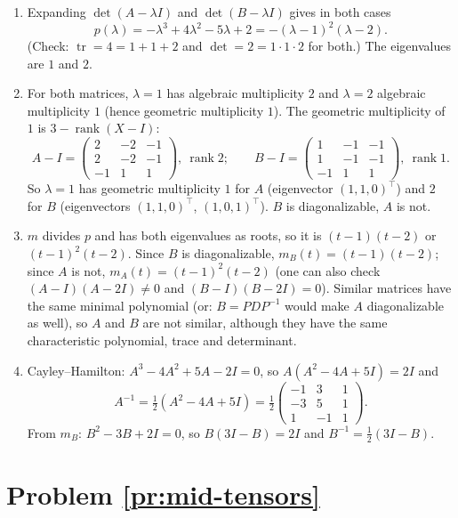 \documentclass[11pt]{article}
\DeclareMathOperator{\rank}{rank}
\DeclareMathOperator{\tr}{tr}
\begin{document}
\begin{enumerate}[label=(\alph*)]
    \item Expanding $\det(A - \lambda I)$ and $\det(B - \lambda I)$ gives in both cases
    \[p(\lambda) = -\lambda^3 + 4\lambda^2 - 5\lambda + 2 = -(\lambda - 1)^2(\lambda - 2).\]
    (Check: $\tr = 4 = 1 + 1 + 2$ and $\det = 2 = 1 \cdot 1 \cdot 2$ for both.) The eigenvalues are $1$ and $2$.
    \item For both matrices, $\lambda = 1$ has algebraic multiplicity $2$ and $\lambda = 2$ algebraic multiplicity $1$ (hence geometric multiplicity $1$). The geometric multiplicity of $1$ is $3 - \rank(X - I)$:
    \[A - I = \begin{pmatrix} 2 & -2 & -1 \\ 2 & -2 & -1 \\ -1 & 1 & 1 \end{pmatrix}, \ \rank 2; \qquad B - I = \begin{pmatrix} 1 & -1 & -1 \\ 1 & -1 & -1 \\ -1 & 1 & 1 \end{pmatrix}, \ \rank 1.\]
    So $\lambda = 1$ has geometric multiplicity $1$ for $A$ (eigenvector $(1, 1, 0)^\top$) and $2$ for $B$ (eigenvectors $(1, 1, 0)^\top$, $(1, 0, 1)^\top$). $B$ is diagonalizable, $A$ is not.
    \item $m$ divides $p$ and has both eigenvalues as roots, so it is $(t - 1)(t - 2)$ or $(t - 1)^2(t - 2)$. Since $B$ is diagonalizable, $m_B(t) = (t - 1)(t - 2)$; since $A$ is not, $m_A(t) = (t - 1)^2(t - 2)$ (one can also check $(A - I)(A - 2I) \neq 0$ and $(B - I)(B - 2I) = 0$). Similar matrices have the same minimal polynomial (or: $B = PDP^{-1}$ would make $A$ diagonalizable as well), so $A$ and $B$ are not similar, although they have the same characteristic polynomial, trace and determinant.
    \item Cayley--Hamilton: $A^3 - 4A^2 + 5A - 2I = 0$, so $A(A^2 - 4A + 5I) = 2I$ and
    \[A^{-1} = \tfrac{1}{2}(A^2 - 4A + 5I) = \tfrac{1}{2}\begin{pmatrix} -1 & 3 & 1 \\ -3 & 5 & 1 \\ 1 & -1 & 1 \end{pmatrix}.\]
    From $m_B$: $B^2 - 3B + 2I = 0$, so $B(3I - B) = 2I$ and $B^{-1} = \frac{1}{2}(3I - B)$.
\end{enumerate}

\section*{Problem \ref{pr:mid-tensors}}
\end{document}
